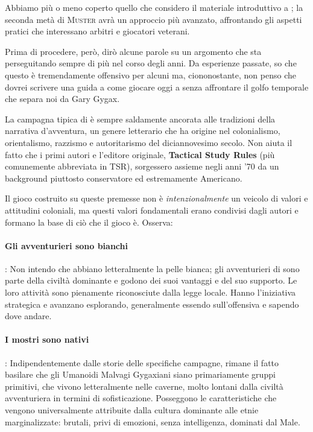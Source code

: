 
Abbiamo più o meno coperto quello che considero il materiale introduttivo a \dnd{}; la seconda metà di \textsc{Muster} avrà un approccio più avanzato, affrontando gli aspetti pratici che interessano arbitri e giocatori veterani.

Prima di procedere, però, dirò alcune parole su un argomento che sta perseguitando \dnd{} sempre di più nel corso degli anni. Da esperienze passate, so che questo è tremendamente offensivo per alcuni ma, ciononostante, non penso che dovrei scrivere una guida a come giocare oggi a \dnd{} senza affrontare il golfo temporale che separa noi da Gary Gygax.


La campagna tipica di \dnd{} è sempre saldamente ancorata alle tradizioni della narrativa d'avventura, un genere letterario che ha origine nel colonialismo, orientalismo, razzismo e autoritarismo del diciannovesimo secolo. Non aiuta il fatto che i primi autori e l'editore originale, \textbf{Tactical Study Rules} (più comunemente abbreviata in TSR), sorgessero assieme negli anni '70 da un background piuttosto conservatore ed estremamente Americano.

Il gioco costruito su queste premesse non è \textit{intenzionalmente} un veicolo di valori e attitudini coloniali, ma questi valori fondamentali erano condivisi dagli autori e formano la base di ciò che il gioco è. Osserva:

\paragraph{Gli avventurieri sono bianchi}: Non intendo che abbiano letteralmente la pelle bianca; gli avventurieri di \dnd{} sono parte della civiltà dominante e godono dei suoi vantaggi e del suo supporto. Le loro attività sono pienamente riconosciute dalla legge locale. Hanno l'iniziativa strategica e avanzano esplorando, generalmente essendo sull'offensiva e sapendo dove andare.

\paragraph{I mostri sono nativi}: Indipendentemente dalle storie delle specifiche campagne, rimane il fatto basilare che gli Umanoidi Malvagi Gygaxiani siano primariamente gruppi primitivi, che vivono letteralmente nelle caverne, molto lontani dalla civiltà avventuriera in termini di sofisticazione. Posseggono le caratteristiche che vengono universalmente attribuite dalla cultura dominante alle etnie marginalizzate: brutali, privi di emozioni, senza intelligenza, dominati dal Male.


